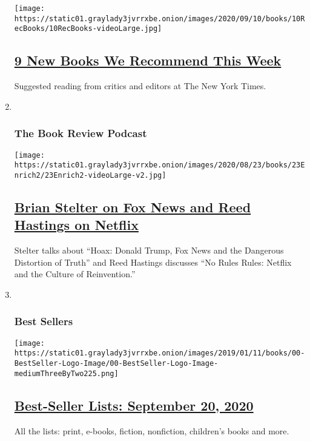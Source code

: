 \begin{enumerate}
  \texttt{[image: https://static01.graylady3jvrrxbe.onion/images/2020/09/10/books/10RecBooks/10RecBooks-videoLarge.jpg]}

  \hypertarget{9-new-books-we-recommend-this-week}{%
  \subsection{\texorpdfstring{\href{/2020/09/10/books/review/9-new-books-we-recommend-this-week.html}{9
  New Books We Recommend This
  Week}}{9 New Books We Recommend This Week}}\label{9-new-books-we-recommend-this-week}}

  Suggested reading from critics and editors at The New York Times.
\item ~
  \hypertarget{the-book-review-podcast}{%
  \subsubsection{The Book Review
  Podcast}\label{the-book-review-podcast}}

  \texttt{[image: https://static01.graylady3jvrrxbe.onion/images/2020/08/23/books/23Enrich2/23Enrich2-videoLarge-v2.jpg]}

  \hypertarget{brian-stelter-on-fox-news-and-reed-hastings-on-netflix}{%
  \subsection{\texorpdfstring{\href{/2020/09/11/books/review/podcast-hoax-fox-news-donald-trump-brian-stelter-nextflix-reed-hastings.html}{Brian
  Stelter on Fox News and Reed Hastings on
  Netflix}}{Brian Stelter on Fox News and Reed Hastings on Netflix}}\label{brian-stelter-on-fox-news-and-reed-hastings-on-netflix}}

  Stelter talks about ``Hoax: Donald Trump, Fox News and the Dangerous
  Distortion of Truth'' and Reed Hastings discusses ``No Rules Rules:
  Netflix and the Culture of Reinvention.''
\item ~
  \hypertarget{best-sellers}{%
  \subsubsection{Best Sellers}\label{best-sellers}}

  \texttt{[image: https://static01.graylady3jvrrxbe.onion/images/2019/01/11/books/00-BestSeller-Logo-Image/00-BestSeller-Logo-Image-mediumThreeByTwo225.png]}

  \hypertarget{best-seller-lists-september-20-2020}{%
  \subsection{\texorpdfstring{\href{/interactive/2020/01/29/books/review/best-sellers-promo-for-front-copy2.html}{Best-Seller
  Lists: September 20,
  2020}}{Best-Seller Lists: September 20, 2020}}\label{best-seller-lists-september-20-2020}}

  All the lists: print, e-books, fiction, nonfiction, children's books
  and more.
\end{enumerate}

